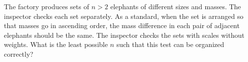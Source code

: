 \problem
The factory produces sets of $n > 2$ elephants of different sizes and masses.
The inspector checks each set separately.
As a standard, when the set is arranged so that masses go in ascending order,
the mass difference in each pair of adjacent elephants should be the same.
The inspector checks the sets with scales without weights.
What is the least possible $n$ such that this test can be organized
correctly?

\solution

\endproblem
